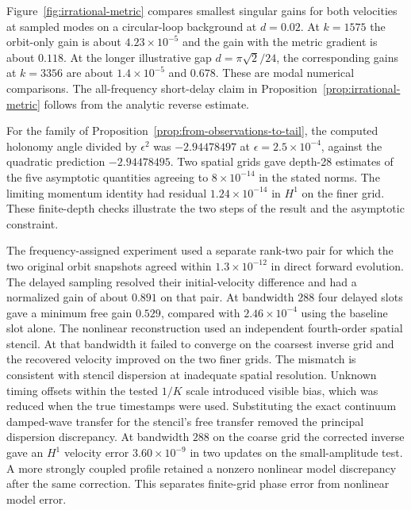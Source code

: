 Figure~\ref{fig:irrational-metric} compares smallest
singular gains for both velocities at sampled modes on
a circular-loop background at $d=0.02$.
At $k=1575$ the orbit-only gain is about
$4.23\times10^{-5}$ and the gain with the metric
gradient is about $0.118$. At the longer
illustrative gap $d=\pi\sqrt2/24$, the corresponding
gains at $k=3356$ are about $1.4\times10^{-5}$
and $0.678$. These are modal numerical comparisons.
The all-frequency short-delay claim in
Proposition~\ref{prop:irrational-metric} follows
from the analytic reverse estimate.

For the family of Proposition~\ref{prop:from-observations-to-tail},
the computed holonomy angle divided by
$\epsilon^2$ was $-2.94478497$ at
$\epsilon=2.5\times10^{-4}$, against the
quadratic prediction $-2.94478495$.
Two spatial grids gave depth-28 estimates of
the five asymptotic quantities agreeing to
$8\times10^{-14}$ in the stated norms.
The limiting momentum identity had residual
$1.24\times10^{-14}$ in $H^1$ on the finer grid.
These finite-depth checks illustrate the two
steps of the result and the asymptotic constraint.

The frequency-assigned experiment used a separate
rank-two pair for which the two original orbit snapshots
agreed within $1.3\times10^{-12}$ in direct forward
evolution. The delayed sampling resolved their
initial-velocity difference and had a normalized gain
of about $0.891$ on that pair. At bandwidth $288$ four
delayed slots gave a minimum free gain $0.529$,
compared with $2.46\times10^{-4}$ using the baseline
slot alone. The nonlinear reconstruction used an
independent fourth-order spatial stencil. At that
bandwidth it failed to converge on the coarsest
inverse grid and the recovered velocity improved
on the two finer grids. The mismatch is consistent
with stencil dispersion at inadequate spatial
resolution. Unknown timing offsets within the tested
$1/K$ scale introduced visible bias, which was reduced
when the true timestamps were used.
Substituting the exact continuum damped-wave transfer
for the stencil's free transfer removed the principal
dispersion discrepancy. At bandwidth $288$ on the
coarse grid the corrected inverse gave an $H^1$
velocity error $3.60\times10^{-9}$ in two updates
on the small-amplitude test. A more strongly coupled
profile retained a nonzero nonlinear model discrepancy
after the same correction. This separates finite-grid
phase error from nonlinear model error.

